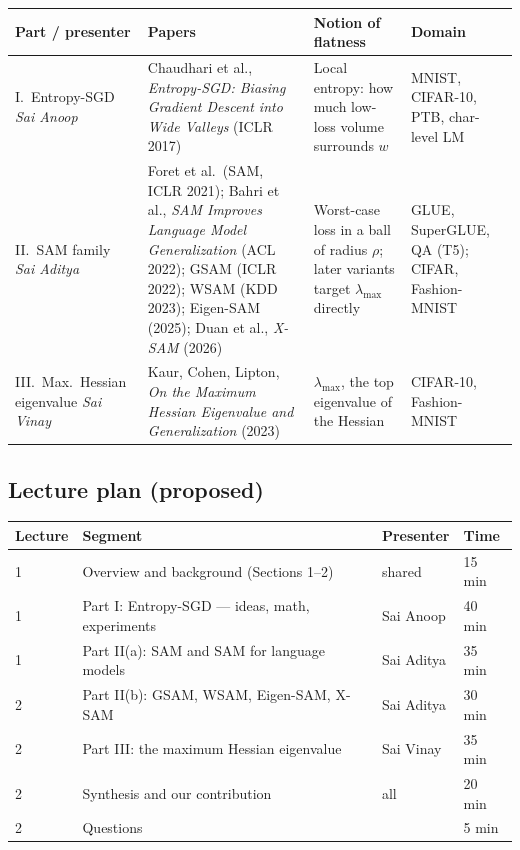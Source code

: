 \documentclass[11pt]{article}
\newcommand{\lmax}{\lambda_{\max}}
\theoremstyle{plain}
\begin{document}
\begin{center}\small
\begin{tabularx}{\textwidth}{@{}p{2.3cm}LLp{2.6cm}@{}}
\toprule
\textbf{Part / presenter} & \textbf{Papers} & \textbf{Notion of flatness} & \textbf{Domain} \\
\midrule
I.\ Entropy-SGD \newline \emph{Sai Anoop} &
Chaudhari et al., \emph{Entropy-SGD: Biasing Gradient Descent into Wide Valleys} (ICLR 2017) &
Local entropy: how much low-loss volume surrounds $w$ &
MNIST, CIFAR-10, PTB, char-level LM \\
\addlinespace
II.\ SAM family \newline \emph{Sai Aditya} &
Foret et al.\ (SAM, ICLR 2021); Bahri et al., \emph{SAM Improves Language Model Generalization} (ACL 2022);
GSAM (ICLR 2022); WSAM (KDD 2023); Eigen-SAM (2025); Duan et al., \emph{X-SAM} (2026) &
Worst-case loss in a ball of radius $\rho$; later variants target $\lmax$ directly &
GLUE, SuperGLUE, QA (T5); CIFAR, Fashion-MNIST \\
\addlinespace
III.\ Max.\ Hessian eigenvalue \newline \emph{Sai Vinay} &
Kaur, Cohen, Lipton, \emph{On the Maximum Hessian Eigenvalue and Generalization} (2023) &
$\lmax$, the top eigenvalue of the Hessian &
CIFAR-10, Fashion-MNIST \\
\bottomrule
\end{tabularx}
\end{center}

\subsection{Lecture plan (proposed)}

\begin{center}\small
\begin{tabular}{@{}llll@{}}
\toprule
\textbf{Lecture} & \textbf{Segment} & \textbf{Presenter} & \textbf{Time} \\
\midrule
1 & Overview and background (Sections 1--2)             & shared     & 15 min \\
1 & Part I: Entropy-SGD --- ideas, math, experiments     & Sai Anoop  & 40 min \\
1 & Part II(a): SAM and SAM for language models          & Sai Aditya & 35 min \\
\midrule
2 & Part II(b): GSAM, WSAM, Eigen-SAM, X-SAM             & Sai Aditya & 30 min \\
2 & Part III: the maximum Hessian eigenvalue             & Sai Vinay  & 35 min \\
2 & Synthesis and our contribution                       & all        & 20 min \\
2 & Questions                                            &            & 5 min \\
\bottomrule
\end{tabular}
\end{center}
\end{document}

